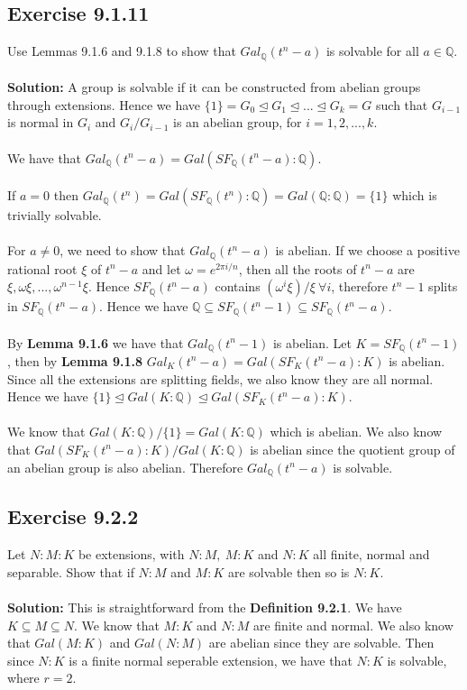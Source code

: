 \documentclass{article}
\begin{document}
\subsection*{Exercise 9.1.11}
Use Lemmas 9.1.6 and 9.1.8 to show that $Gal_{\mathbb{Q}}(t^n - a)$ is solvable for all $a \in \mathbb{Q}$.
\\\\
\textbf{Solution:}
A group is solvable if it can be constructed from abelian groups through extensions.
Hence we have $\{1\} = G_0 \unlhd G_1 \unlhd ... \unlhd G_k = G$ such that $G_{i-1}$ is normal in $G_i$ and $G_{i} / G_{i-1}$
is an abelian group, for $i = 1, 2, ..., k$.
\\\\
We have that $Gal_{\mathbb{Q}}(t^n-a) = Gal(SF_{\mathbb{Q}}(t^n - a): \mathbb{Q})$.
\\\\
If $a=0$ then $Gal_{\mathbb{Q}}(t^n) = Gal(SF_{\mathbb{Q}}(t^n): \mathbb{Q}) = Gal(\mathbb{Q}: \mathbb{Q}) = \{1\}$ which is trivially solvable. 
\\\\
For $a \neq 0$, we need to show that $Gal_{\mathbb{Q}}(t^n-a)$ is abelian. If we choose a positive rational root $\xi$ of $t^n - a$ and let $\omega = e^{2\pi i /n}$, then
all the roots of $t^n - a$ are $\xi, \omega\xi, ..., \omega^{n-1}\xi$. Hence $SF_{\mathbb{Q}}(t^n - a)$ contains $(\omega^i\xi)/\xi \ \forall i$, therefore $t^n-1$ splits in $SF_{\mathbb{Q}}(t^n - a)$.
Hence we have $\mathbb{Q} \subseteq SF_{\mathbb{Q}}(t^n-1) \subseteq SF_{\mathbb{Q}}(t^n-a)$.
\\\\
By \textbf{Lemma 9.1.6} we have that $Gal_{\mathbb{Q}}(t^n-1)$ is abelian.  Let $K = SF_{\mathbb{Q}}(t^n-1)$, then by \textbf{Lemma 9.1.8} $Gal_K(t^n-a) = Gal(SF_K(t^n-a):K)$ is abelian.
Since all the extensions are splitting fields, we also know they are all normal.
Hence we have $\{1\} \unlhd Gal(K:\mathbb{Q}) \unlhd Gal(SF_{K}(t^n-a): K)$.
\\\\
We know that $Gal(K:\mathbb{Q})/\{ 1 \} = Gal(K:\mathbb{Q})$ which is abelian.
We also know that $Gal(SF_{K}(t^n-a):K)/Gal(K:\mathbb{Q})$ is abelian since the quotient group of an abelian group is also abelian.
Therefore $Gal_{\mathbb{Q}}(t^n - a)$  is solvable.

\subsection*{Exercise 9.2.2}
Let $N:M:K$ be extensions, with $N:M,\ M:K$ and $N:K$
all finite, normal and separable. Show that if $N:M$ and $M:K$
are solvable then so is $N:K$.
\\\\
\textbf{Solution:}
This is straightforward from the \textbf{Definition 9.2.1}.
We have $K \subseteq M \subseteq N$. We know that $M:K$ and $N:M$ are finite and normal.
We also know that $Gal(M:K)$ and $Gal(N:M)$ are abelian since they are solvable.
Then since $N:K$ is a finite normal seperable extension, we have that $N:K$ is solvable, where $r = 2$.
\end{document}
